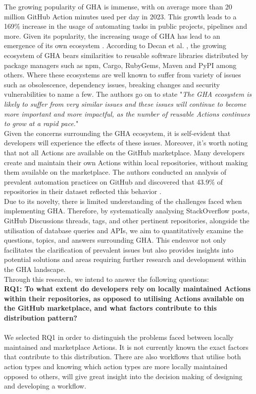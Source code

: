 \documentclass[conference]{IEEEtran}
\begin{document}
    The growing popularity of GHA is immense, with on average more than 20 million GitHub Action minutes used per day in 2023. This growth leads to a 169\% increase in the usage of automating tasks in public projects,  pipelines and more\cite{github2023octoverse}. Given its popularity,  the increasing usage of GHA has lead to an emergence of its own ecosystem \cite{decan2022use}.  According to Decan et al. \cite{decan2022use}, the growing ecosystem of GHA bears similarities to reusable software libraries distributed by package managers such as npm, Cargo, RubyGems, Maven and PyPI among others. Where these ecosystems are well known to suffer from variety of issues such as obsolescence, dependency issues, breaking changes and security vulnerabilities to name a few\cite{decan2022use}. The authors go on to state "\textit{The GHA ecosystem is likely to suffer from very similar issues and these issues will continue to become more important and more impactful, as the number of reusable Actions continues to grow at a rapid pace.}"\\

    Given the concerns surrounding the GHA ecosystem, it is self-evident that developers will experience the effects of these issues.  Moreover, it's worth noting that not all Actions are available on the GitHub marketplace. Many developers create and maintain their own Actions within local repositories, without making them available on the marketplace. The authors  conducted an analysis of prevalent automation practices on GitHub and discovered that 43.9\% of repositories in their dataset reflected this behavior \cite{decan2022use}.\\

    Due to its novelty, there is limited understanding of the challenges faced when implementing GHA.  
    Therefore,  by systematically analysing StackOverflow posts, GitHub Discussions threads, tags, and other pertinent repositories, alongside the utilisation of database queries and APIs, we aim to quantitatively examine the questions, topics, and answers surrounding GHA. This endeavor not only facilitates the clarification of prevalent issues but also provides insights into potential solutions and areas requiring further research and development within the GHA landscape.\\

    Through this research, we intend to answer the following questions:\\


     \textbf{RQ1: To what extent do developers rely on locally maintained Actions within their repositories, as opposed to utilising Actions available on the GitHub marketplace, and what factors contribute to this distribution pattern?}\\\\
        We selected RQ1 in order to distinguish the problems faced between locally maintained and marketplace Actions. It is not currently known the exact factors that contribute to this distribution. There are also workflows that utilise both action types and knowing which action types are more locally maintained opposed to others, will give great insight into the decision making of designing and developing a workflow. \\
\end{document}

